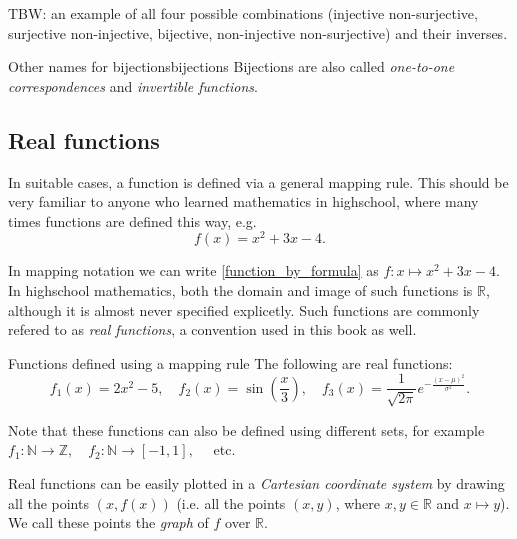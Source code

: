 TBW: an example of all four possible combinations (injective non-surjective, surjective non-injective, bijective, non-injective non-surjective) and their inverses.

\begin{note}{Other names for bijections}{bijections}
	Bijections are also called \emph{one-to-one correspondences} and \emph{invertible functions}.
\end{note}

\subsection{Real functions}
In suitable cases, a function is defined via a general mapping rule. This should be very familiar to anyone who learned mathematics in highschool, where many times functions are defined this way, e.g.
\begin{equation}
	f(x) = x^{2}+3x-4.
	\label{eq:function_by_formula}
\end{equation}

In mapping notation we can write \eqref{function_by_formula} as $f:x\mapsto x^{2}+3x-4$. In highschool mathematics, both the domain and image of such functions is $\mathbb{R}$, although it is almost never specified explicetly. Such functions are commonly refered to as \emph{real functions}, a convention used in this book as well.

\begin{example}{Functions defined using a mapping rule}{}
	The following are real functions:
	\[
		f_{1}(x) = 2x^{2}-5,\quad f_{2}(x)=\sin\left( \frac{x}{3} \right),\quad f_{3}(x)=\frac{1}{\sqrt{2\pi}}e^{-\frac{(x-\mu)^{2}}{\sigma^{2}}}.
	\]

	Note that these functions can also be defined using different sets, for example $f_{1}:\mathbb{N}\to\mathbb{Z},\quad f_{2}:\mathbb{N}\to[-1,1],\quad$ etc.
\end{example}

Real functions can be easily plotted in a \emph{Cartesian coordinate system} by drawing all the points $\left( x,f(x) \right)$ (i.e. all the points $\left( x,y \right)$, where $x,y\in\mathbb{R}$ and $x\mapsto y$). We call these points the \emph{graph} of $f$ over $\mathbb{R}$.

